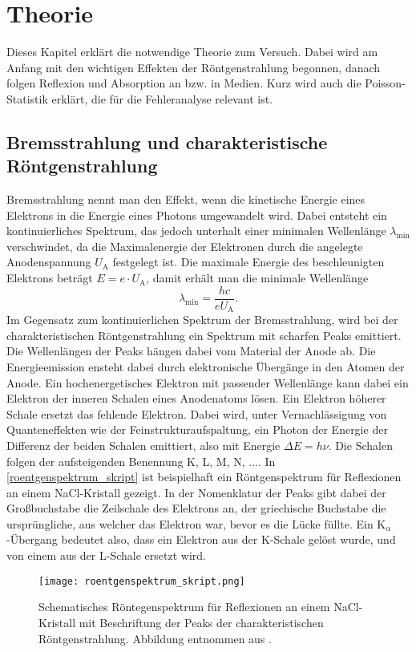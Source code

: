 \section{Theorie}
\label{sec:theorie}
Dieses Kapitel erklärt die notwendige Theorie zum Versuch. Dabei wird am Anfang mit den wichtigen Effekten der Röntgenstrahlung begonnen, danach folgen Reflexion und Absorption an bzw. in Medien. Kurz wird auch die Poisson-Statistik erklärt, die für die Fehleranalyse relevant ist. \cite{roentgenskript}


\subsection{Bremsstrahlung und charakteristische Röntgenstrahlung}
Bremsstrahlung nennt man den Effekt, wenn die kinetische Energie eines Elektrons in die Energie eines Photons umgewandelt wird. Dabei entsteht ein kontinuierliches Spektrum, das jedoch unterhalt einer minimalen Wellenlänge $\lambda_{\mathrm{min}}$ verschwindet, da die Maximalenergie der Elektronen durch die angelegte Anodenspannung $U_{\mathrm{A}}$ festgelegt ist. Die maximale Energie des beschleunigten Elektrons beträgt $E=e\cdot U_{\mathrm{A}}$, damit erhält man die minimale Wellenlänge 
\begin{equation}
	\lambda_{\mathrm{min}}=\frac{hc}{eU_{\mathrm{A}}}. 
\end{equation}
Im Gegensatz zum kontinuierlichen Spektrum der Bremsstrahlung, wird bei der charakteristischen Röntgenstrahlung ein Spektrum mit scharfen Peaks emittiert. Die Wellenlängen der Peaks hängen dabei vom Material der Anode ab. Die Energieemission ensteht dabei durch elektronische Übergänge in den Atomen der Anode. Ein hochenergetisches Elektron mit passender Wellenlänge kann dabei ein Elektron der inneren Schalen eines Anodenatoms lösen. Ein Elektron höherer Schale ersetzt das fehlende Elektron. Dabei wird, unter Vernachlässigung von Quanteneffekten wie der Feinstrukturaufspaltung, ein Photon der Energie der Differenz der beiden Schalen emittiert, also mit Energie $\Delta E=h\nu$. Die Schalen folgen der aufsteigenden Benennung K, L, M, N, .... In \autoref{roentgenspektrum_skript} ist beispielhaft ein Röntgenspektrum für Reflexionen an einem NaCl-Kristall gezeigt. In der Nomenklatur der Peaks gibt dabei der Großbuchstabe die Zeilschale des Elektrons an, der griechische Buchstabe die ursprüngliche, aus welcher das Elektron war, bevor es die Lücke füllte. Ein K$_\alpha$-Übergang bedeutet also, dass ein Elektron aus der K-Schale gelöst wurde, und von einem aus der L-Schale ersetzt wird.    
\begin{figure}[H]
	\centering
	\texttt{[image: roentgenspektrum\_skript.png]}
	\caption{Schematisches Röntegenspektrum für Reflexionen an einem NaCl-Kristall mit Beschriftung der Peaks der charakteristischen Röntgenstrahlung. Abbildung entnommen aus \cite{roentgenskript}. }
	\label{roentgenspektrum_skript}
\end{figure}

